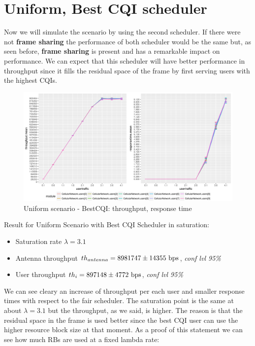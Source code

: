 \section{Uniform, Best CQI scheduler}
Now we will simulate the scenario by using the second scheduler. If there were not \textbf{frame sharing} the performance of both scheduler would be the same but, as seen before, \textbf{frame sharing} is present and has a remarkable impact on performance. We can expect that this scheduler will have better performance in throughput since it fills the residual space of the frame by first serving users with the highest CQIs.
\begin{figure}[H]
  \includegraphics[width=1\textwidth]{images/all-unifbest}
   \caption{Uniform scenario - BestCQI: throughput, response time}
  \label{fig:Uniform scenario - BestCQI: throughput, response time}
\end{figure}

Result for Uniform Scenario with Best CQI Scheduler in saturation:
\begin{itemize}
	\item Saturation rate \(\lambda = 3.1\)
	\item Antenna throughput \(th_{antenna} = 8981747 \pm 14355 \textnormal{ bps}\), \textit{conf lvl 95\%}
	\item User throughput \(th_{i} = 897148 \pm 4772 \textnormal{ bps}\), \textit{conf lvl 95\%}
\end{itemize} 
We can see cleary an increase of throughput per each user and smaller response times with respect to the fair scheduler. The saturation point is the same at about \(\lambda=3.1\) but the throughput, as we said, is higher. The reason is that the residual space in the frame is used better since the best CQI user can use the higher resource block size at that moment. As a proof of this statement we can see how much RBs are used at a fixed lambda rate:

